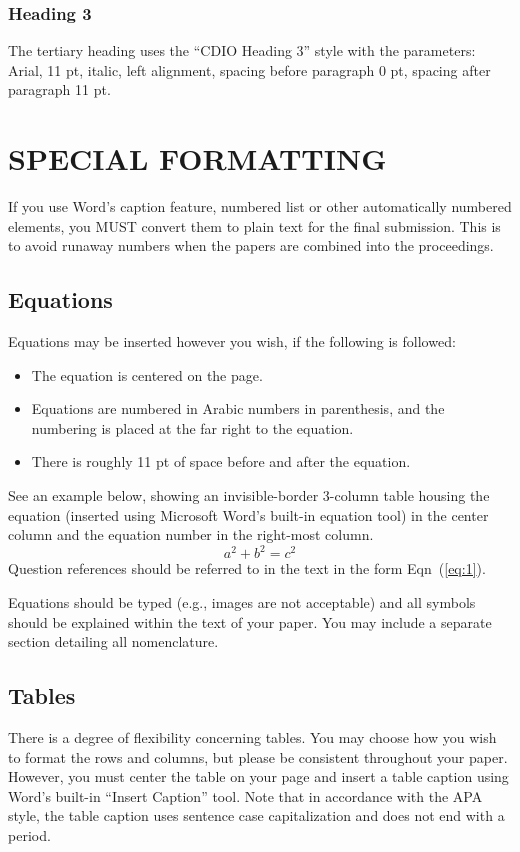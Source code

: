 \documentclass[11pt]{cdio}
\begin{document}
\subsubsection{Heading 3}

The tertiary heading uses the ``CDIO Heading 3'' style with the parameters: Arial, 11 pt, italic, left alignment, spacing before paragraph 0 pt, spacing after paragraph 11 pt.

\section{SPECIAL FORMATTING}

If you use Word’s caption feature, numbered list or other automatically numbered elements, you MUST convert them to plain text for the final submission.
This is to avoid runaway numbers when the papers are combined into the proceedings.

\subsection{Equations}

Equations may be inserted however you wish, if the following is followed:
\begin{itemize}
\item The equation is centered on the page. 
\item Equations are numbered in Arabic numbers in parenthesis, and the numbering is placed at the far right to the equation. 
\item There is roughly 11 pt of space before and after the equation. 
\end{itemize}
See an example below, showing an invisible-border 3-column table housing the equation (inserted using Microsoft Word’s built-in equation tool) in the center column and the equation number in the right-most column.
\begin{equation}\label{eq:1}
  a^{2} + b^{2} = c^{2}
\end{equation}
Question references should be referred to in the text in the form Eqn~(\ref{eq:1}).

Equations should be typed (e.g., images are not acceptable) and all symbols should be explained within the text of your paper. You may include a separate section detailing all nomenclature.

\subsection{Tables}
There is a degree of flexibility concerning tables.
You may choose how you wish to format the rows and columns, but please be consistent throughout your paper.
However, you must center the table on your page and insert a table caption using Word’s built-in “Insert Caption” tool.
Note that in accordance with the APA style, the table caption uses sentence case capitalization and does not end with a period.
\end{document}
